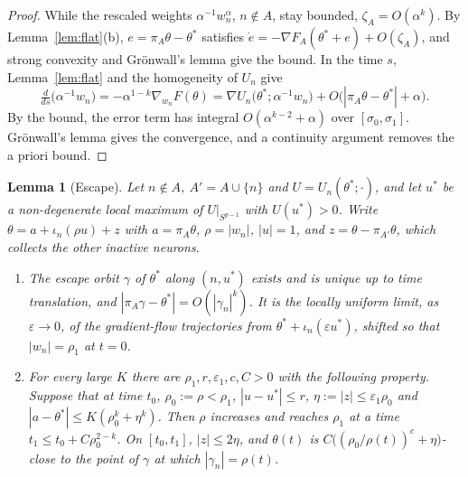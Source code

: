 \documentclass[11pt]{article}
\newtheorem{lemma}{Lemma}
\theoremstyle{definition}
\theoremstyle{remark}
\newcommand{\eps}{\varepsilon}
\begin{document}
\begin{proof}
While the rescaled weights $\alpha^{-1}w^\alpha_n$, $n\notin A$, stay bounded, $\zeta_A=O(\alpha^k)$. By Lemma~\ref{lem:flat}(b), $e=\pi_A\theta-\theta^*$ satisfies $\dot e=-\nabla F_A(\theta^*+e)+O(\zeta_A)$, and strong convexity and Grönwall's lemma give the bound. In the time $s$, Lemma~\ref{lem:flat} and the homogeneity of $U_n$ give
\[
\tfrac{d}{ds}\big(\alpha^{-1}w_n\big)=-\alpha^{1-k}\nabla_{w_n}F(\theta)=\nabla U_n\big(\theta^*;\alpha^{-1}w_n\big)+O\big(|\pi_A\theta-\theta^*|+\alpha\big).
\]
By the bound, the error term has integral $O(\alpha^{k-2}+\alpha)$ over $[\sigma_0,\sigma_1]$. Grönwall's lemma gives the convergence, and a continuity argument removes the a priori bound.
\end{proof}

\begin{lemma}[Escape]\label{lem:escape}
Let $n\notin A$, $A'=A\cup\{n\}$ and $U=U_n(\theta^*;\cdot)$, and let $u^*$ be a non-degenerate local maximum of $U|_{S^{p-1}}$ with $U(u^*)>0$. Write $\theta=a+\iota_n(\rho u)+z$ with $a=\pi_A\theta$, $\rho=|w_n|$, $|u|=1$, and $z=\theta-\pi_{A'}\theta$, which collects the other inactive neurons.
\begin{enumerate}[label=\textup{(\alph*)},nosep]
\item The escape orbit $\gamma$ of $\theta^*$ along $(n,u^*)$ exists and is unique up to time translation, and $|\pi_A\gamma-\theta^*|=O(|\gamma_n|^k)$. It is the locally uniform limit, as $\eps\to0$, of the gradient-flow trajectories from $\theta^*+\iota_n(\eps u^*)$, shifted so that $|w_n|=\rho_1$ at $t=0$.
\item For every large $K$ there are $\rho_1,r,\eps_1,c,C>0$ with the following property. Suppose that at time $t_0$, $\rho_0:=\rho<\rho_1$, $|u-u^*|\le r$, $\eta:=|z|\le\eps_1\rho_0$ and $|a-\theta^*|\le K(\rho_0^k+\eta^k)$. Then $\rho$ increases and reaches $\rho_1$ at a time $t_1\le t_0+C\rho_0^{2-k}$. On $[t_0,t_1]$, $|z|\le2\eta$, and $\theta(t)$ is $C\big((\rho_0/\rho(t))^c+\eta\big)$-close to the point of $\gamma$ at which $|\gamma_n|=\rho(t)$.
\end{enumerate}
\end{lemma}
\end{document}
